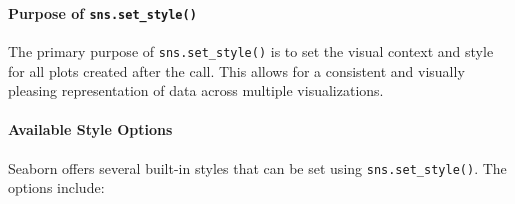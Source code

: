 \documentclass[
  letterpaper,
  DIV=11,
  numbers=noendperiod]{scrreprt}
\let\oldparagraph\paragraph
\renewcommand{\paragraph}[1]{\oldparagraph{#1}\mbox{}}
\begin{document}
\hypertarget{purpose-of-sns.set_style}{%
\paragraph{\texorpdfstring{Purpose of
\texttt{sns.set\_style()}}{Purpose of sns.set\_style()}}\label{purpose-of-sns.set_style}}

The primary purpose of \texttt{sns.set\_style()} is to set the visual
context and style for all plots created after the call. This allows for
a consistent and visually pleasing representation of data across
multiple visualizations.

\hypertarget{available-style-options}{%
\paragraph{Available Style Options}\label{available-style-options}}

Seaborn offers several built-in styles that can be set using
\texttt{sns.set\_style()}. The options include:
\end{document}
